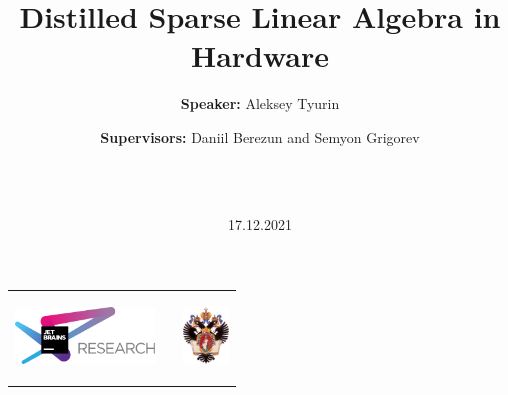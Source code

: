 \documentclass[xcolor=table]{beamer}
\title[Distilled algebra in hardware]{Distilled Sparse Linear Algebra in Hardware}
\institute[SPbU]{
JetBrains Research, Programming Languages and Tools Lab  \\
SPbU
}
\author[Aleksey Tyurin]{{{\bfseries Speaker:} Aleksey Tyurin}\\
  \and  
    {\scriptsize{\bfseries Supervisors:} Daniil Berezun and Semyon Grigorev}\and\\
\\}
\date{17.12.2021}
\begin{document}
{
\begin{frame}
  \begin{tabular}{p{2.0cm} p{7.5cm} p{1cm}}
  \begin{center}
      \includegraphics[height=1.5cm]{pictures/jetbrainsResearch.pdf}
    \end{center}
    &
    \begin{center}
    \end{center}
    &
    \begin{flushright}
      \includegraphics[height=1.5cm]{pictures/SPbGU_Logo.png}
    \end{flushright}
  \end{tabular}
  \titlepage
\end{frame}


}
\end{document}
